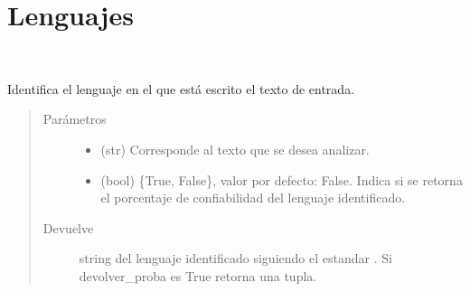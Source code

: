 \documentclass[letterpaper,10pt,openany,spanish]{sphinxmanual}
\begin{document}
\chapter{Lenguajes}
\label{\detokenize{funciones/lenguajes:module-lenguajes}}\label{\detokenize{funciones/lenguajes:lenguajes}}\label{\detokenize{funciones/lenguajes::doc}}

\begin{fulllineitems}
\label{\detokenize{funciones/lenguajes:lenguajes.detectar_lenguaje}}~\begin{description}
\item[{Identifica el lenguaje en el que está escrito el texto de entrada. }] \leavevmode
{\hyperref[\detokenize{seccion_ejemplos:detectar-lenguaje}]{}}

\end{description}
\begin{quote}\begin{description}
\item[{Parámetros}] \leavevmode\begin{itemize}
\item {} 
 \textendash{} (str) Corresponde al texto que se desea analizar.

\item {} 
 \textendash{} (bool) \{True, False\}, valor por defecto: False. 
Indica si se retorna el porcentaje de confiabilidad del 
lenguaje identificado.

\end{itemize}

\item[{Devuelve}] \leavevmode
string del lenguaje identificado siguiendo el estandar 
. 
Si devolver\_proba es True retorna una tupla.

\end{description}\end{quote}

\end{fulllineitems}
\end{document}
